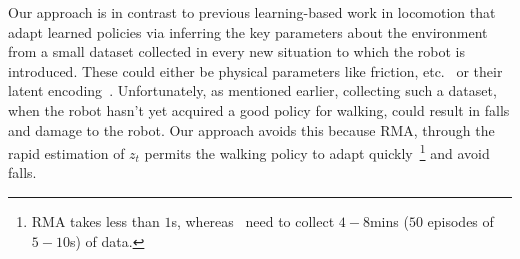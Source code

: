 \documentclass[conference]{IEEEtran}
\begin{document}
Our approach is in contrast to previous learning-based work in locomotion that adapt learned policies via inferring the key parameters about the environment from a small dataset collected in every new situation to which the robot is introduced. These could either be physical parameters like friction, etc.~\cite{bongard2005nonlinear} or their latent encoding~\cite{peng2020learning}. Unfortunately, as mentioned earlier, collecting such a dataset, when the robot hasn't yet acquired a good policy for walking, could result in falls and damage to the robot. Our approach avoids this because RMA, through the rapid estimation of $z_t$ permits the walking policy to adapt quickly~\footnote{RMA takes less than $1$s, whereas~\citet{peng2020learning} need to collect $4-8$mins ($50$ episodes of $5-10$s) of data.} and avoid falls. 
\end{document}
